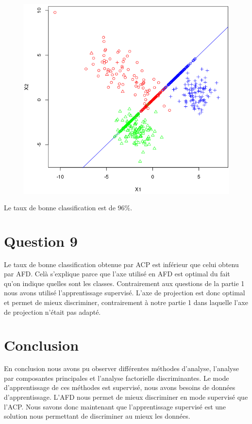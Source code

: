 \documentclass[a4paper,12pt]{report}
\begin{document}
\begin{figure}[!ht]
	\center
	\includegraphics[scale=0.4]{image/q8.png}
\end{figure}

Le taux de bonne classification est de 96$\%$. 

\newpage

\section*{Question 9}
Le taux de bonne classification obtenue par ACP est inférieur que celui obtenu par AFD. Celà s'explique parce que l'axe utilisé en AFD est optimal du fait qu'on indique quelles sont les classes.
Contrairement aux questions de la partie 1 nous avons utilisé l'apprentissage supervisé. L'axe de projection est donc optimal et permet de mieux discriminer, contrairement à notre partie 1 dans laquelle l'axe de projection n'était pas adapté.


\section*{Conclusion}

En conclusion nous avons pu observer différentes méthodes d'analyse, l'analyse par composantes principales et l'analyse factorielle discriminantes. Le mode d'apprentissage de ces méthodes est supervisé, nous avons besoins de données d'apprentissage. L'AFD nous permet de mieux discriminer en mode supervisé que l'ACP. Nous savons donc maintenant que l'apprentissage supervisé est une solution nous permettant de discriminer au mieux les données.
\end{document}
